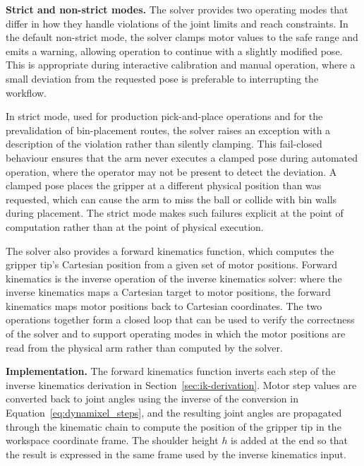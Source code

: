 \textbf{Strict and non-strict modes.} The solver provides two 
operating modes that differ in how they handle violations of 
the joint limits and reach constraints. In the default 
non-strict mode, the solver clamps motor values to the safe 
range and emits a warning, allowing operation to continue with a 
slightly modified pose. This is appropriate during interactive 
calibration and manual operation, where a small deviation from 
the requested pose is preferable to interrupting the workflow.

In strict mode, used for production pick-and-place operations 
and for the prevalidation of bin-placement routes, the solver 
raises an exception with a description of the violation rather 
than silently clamping. This fail-closed behaviour ensures that 
the arm never executes a clamped pose during automated operation, 
where the operator may not be present to detect the deviation. 
A clamped pose places the gripper at a different physical 
position than was requested, which can cause the arm to miss the 
ball or collide with bin walls during placement. The strict mode 
makes such failures explicit at the point of computation rather 
than at the point of physical execution.

\label{sec:fk-validation}

The solver also provides a forward kinematics function, which 
computes the gripper tip's Cartesian position from a given set of 
motor positions. Forward kinematics is the inverse operation of 
the inverse kinematics solver: where the inverse kinematics maps 
a Cartesian target to motor positions, the forward kinematics 
maps motor positions back to Cartesian coordinates. The two 
operations together form a closed loop that can be used to 
verify the correctness of the solver and to support operating 
modes in which the motor positions are read from the physical 
arm rather than computed by the solver.

\textbf{Implementation.} The forward kinematics function inverts 
each step of the inverse kinematics derivation in 
Section~\ref{sec:ik-derivation}. Motor step values are converted back to joint 
angles using the inverse of the conversion in Equation~\eqref{eq:dynamixel_steps}, and 
the resulting joint angles are propagated through the kinematic 
chain to compute the position of the gripper tip in the workspace 
coordinate frame. The shoulder height $h$ is added at the end so 
that the result is expressed in the same frame used by the 
inverse kinematics input.

